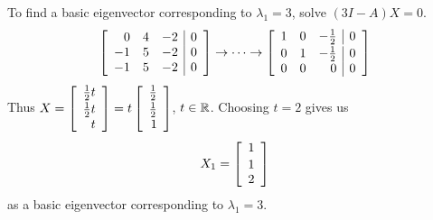 \documentclass[pdf
,handout
]{beamer}
\begin{document}
{{\begin{solution}[continued]
To find a basic eigenvector corresponding to $\lambda_1=3$, solve
$(3I-A)X=0$.
\pause
\[ \left[\begin{array}{rrr|r}
0 & 4 & -2 & 0 \\
-1 & 5 & -2 & 0 \\
-1 & 5 & -2 & 0
\end{array}\right]
\rightarrow \cdots \rightarrow
\left[\begin{array}{rrr|r}\vspace*{.02in}
1 & 0 & -\frac{1}{2} & 0 \\
0 & 1 & -\frac{1}{2} & 0 \\
0 & 0 & 0 & 0
\end{array}\right] \]
\pause
Thus
$X=
\left[\begin{array}{r}\vspace*{.02in}
\frac{1}{2} t \\ \frac{1}{2} t \\ t
\end{array}\right]
=t \left[\begin{array}{r}\vspace*{.02in}
\frac{1}{2} \\ \frac{1}{2} \\ 1
\end{array}\right]$, $t\in\mathbb{R}$.
\pause
Choosing $t=2$ gives us 
\[ X_1=
\left[\begin{array}{r}\vspace*{.02in}
1 \\ 1 \\ 2
\end{array}\right]\]
as a basic eigenvector corresponding to $\lambda_1=3$. 
\end{solution}
}

}
\end{document}
